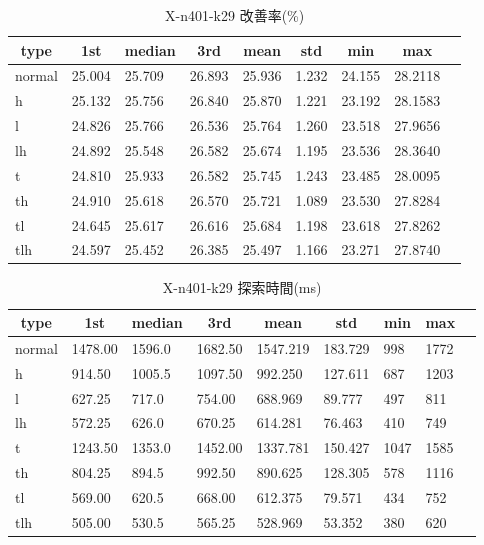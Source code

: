 \begin{table}[htbp]
    \caption{X-n401-k29 改善率(\%)}
    \begin{tabular}{|l|l|l|l|l|l|l|l|l|}\hline
    \multicolumn{1}{|c|}{\textbf{type}}
    &\multicolumn{1}{|c|}{\textbf{1st}}
    &\multicolumn{1}{c|}{\textbf{median}}
    &\multicolumn{1}{c|}{\textbf{3rd}}
    &\multicolumn{1}{c|}{\textbf{mean}}
    &\multicolumn{1}{c|}{\textbf{std}}
    &\multicolumn{1}{c|}{\textbf{min}}
    &\multicolumn{1}{c|}{\textbf{max}}\\\hline
	normal & 25.004 & 25.709 & 26.893 & 25.936 & 1.232 & 24.155 & 28.2118\\\hline
	h & 25.132 & 25.756 & 26.840 & 25.870 & 1.221 & 23.192 & 28.1583\\\hline
	l & 24.826 & 25.766 & 26.536 & 25.764 & 1.260 & 23.518 & 27.9656\\\hline
	lh & 24.892 & 25.548 & 26.582 & 25.674 & 1.195 & 23.536 & 28.3640\\\hline
	t & 24.810 & 25.933 & 26.582 & 25.745 & 1.243 & 23.485 & 28.0095\\\hline
	th & 24.910 & 25.618 & 26.570 & 25.721 & 1.089 & 23.530 & 27.8284\\\hline
	tl & 24.645 & 25.617 & 26.616 & 25.684 & 1.198 & 23.618 & 27.8262\\\hline
	tlh & 24.597 & 25.452 & 26.385 & 25.497 & 1.166 & 23.271 & 27.8740\\\hline
	\end{tabular}
\end{table}
\begin{table}[htbp]
    \caption{X-n401-k29 探索時間(ms)}
    \begin{tabular}{|l|l|l|l|l|l|l|l|l|}\hline
    \multicolumn{1}{|c|}{\textbf{type}}
    &\multicolumn{1}{|c|}{\textbf{1st}}
    &\multicolumn{1}{c|}{\textbf{median}}
    &\multicolumn{1}{c|}{\textbf{3rd}}
    &\multicolumn{1}{c|}{\textbf{mean}}
    &\multicolumn{1}{c|}{\textbf{std}}
    &\multicolumn{1}{c|}{\textbf{min}}
    &\multicolumn{1}{c|}{\textbf{max}}\\\hline
	normal & 1478.00 & 1596.0 & 1682.50 & 1547.219 & 183.729 & 998 & 1772\\\hline
	h & 914.50 & 1005.5 & 1097.50 & 992.250 & 127.611 & 687 & 1203\\\hline
	l & 627.25 & 717.0 & 754.00 & 688.969 & 89.777 & 497 & 811\\\hline
	lh & 572.25 & 626.0 & 670.25 & 614.281 & 76.463 & 410 & 749\\\hline
	t & 1243.50 & 1353.0 & 1452.00 & 1337.781 & 150.427 & 1047 & 1585\\\hline
	th & 804.25 & 894.5 & 992.50 & 890.625 & 128.305 & 578 & 1116\\\hline
	tl & 569.00 & 620.5 & 668.00 & 612.375 & 79.571 & 434 & 752\\\hline
	tlh & 505.00 & 530.5 & 565.25 & 528.969 & 53.352 & 380 & 620\\\hline
	\end{tabular}
\end{table}
